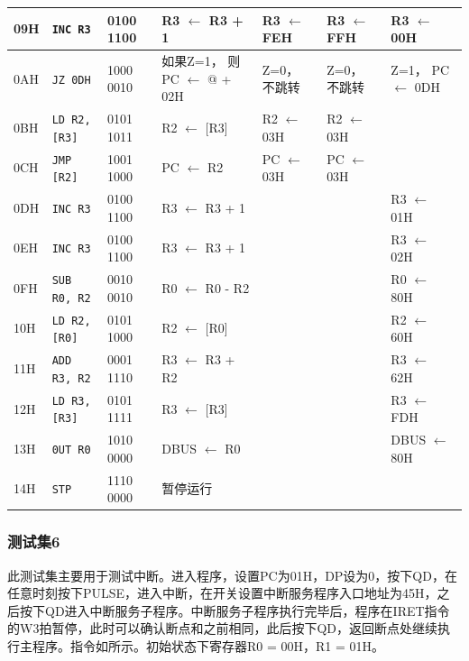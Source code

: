 \documentclass[lang=cn,11pt,a4paper,cite=authornum]{paper}
\begin{document}
\begin{table}[!htbp]
\begin{tabular}{|l|l|l|l|l|l|l|}
		09H & \texttt{INC R3} & 0100 1100 & R3 $\leftarrow$ R3 + 1 & R3 $\leftarrow$ FEH & R3 $\leftarrow$ FFH & R3 $\leftarrow$ 00H \\ \hline 
		0AH & \texttt{JZ 0DH} & 1000 0010 & \makecell[l]{如果Z=1，\\则PC $\leftarrow$ @ + 02H} & \makecell[l]{Z=0，\\不跳转} & \makecell[l]{Z=0，\\不跳转} & \makecell[l]{Z=1，\\PC $\leftarrow$ 0DH} \\ \hline 
		0BH & \texttt{LD R2, [R3]} & 0101 1011 & R2 $\leftarrow$ [R3]  & R2 $\leftarrow$ 03H  & R2 $\leftarrow$ 03H &  \\ \hline 
		0CH & \texttt{JMP [R2]} & 1001 1000 & PC $\leftarrow$ R2 & PC $\leftarrow$ 03H & PC $\leftarrow$ 03H &  \\ \hline 
		0DH & \texttt{INC R3} & 0100 1100 & R3 $\leftarrow$ R3 + 1 &  &  & R3 $\leftarrow$ 01H \\ \hline 
		0EH & \texttt{INC R3} & 0100 1100 & R3 $\leftarrow$ R3 + 1 &  &  & R3 $\leftarrow$ 02H \\ \hline 
		0FH & \texttt{SUB R0, R2} & 0010 0010 & R0 $\leftarrow$ R0 - R2 &  &  & R0 $\leftarrow$ 80H \\ \hline 
		10H & \texttt{LD R2, [R0]} & 0101 1000 & R2 $\leftarrow$ [R0]  &  &  & R2 $\leftarrow$ 60H  \\ \hline 
		11H & \texttt{ADD R3, R2} & 0001 1110 & R3 $\leftarrow$ R3 + R2 &  &  & R3 $\leftarrow$ 62H \\ \hline 
		12H & \texttt{LD R3, [R3]} & 0101 1111 & R3 $\leftarrow$ [R3]  &  &  & R3 $\leftarrow$ FDH  \\ \hline 
		13H & \texttt{0UT R0} & 1010 0000 & DBUS $\leftarrow$ R0 &  &  & DBUS $\leftarrow$ 80H \\ \hline 
		14H & \texttt{STP} & 1110 0000 & 暂停运行 &  &  &  \\ \hline 
    \end{tabular}
\end{table}

\subsubsection{测试集6}

此测试集主要用于测试中断。进入程序，设置PC为01H，DP设为0，按下QD，在任意时刻按下PULSE，进入中断，在开关设置中断服务程序入口地址为45H，之后按下QD进入中断服务子程序。中断服务子程序执行完毕后，程序在IRET指令的W3拍暂停，此时可以确认断点和之前相同，此后按下QD，返回断点处继续执行主程序。指令如所示。初始状态下寄存器R0 = 00H，R1 = 01H。
\end{document}
